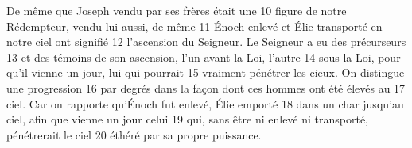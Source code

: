 De même que Joseph vendu par ses frères était une	 
10	 	figure de notre Rédempteur, vendu lui aussi, de même	 
11	 	Énoch enlevé et Élie transporté en notre ciel ont signifié	 
12	 	l'ascension du Seigneur. Le Seigneur a eu des précurseurs	 
13	 	et des témoins de son ascension, l'un avant la Loi, l'autre	 
14	 	sous la Loi, pour qu'il vienne un jour, lui qui pourrait	 
15	 	vraiment pénétrer les cieux. On distingue une progression	 
16	 	par degrés dans la façon dont ces hommes ont été élevés au	 
17	 	ciel. Car on rapporte qu'Énoch fut enlevé, Élie emporté	 
18	 	dans un char jusqu'au ciel, afin que vienne un jour celui	 
19	 	qui, sans être ni enlevé ni transporté, pénétrerait le ciel	 
20	 	éthéré par sa propre puissance.